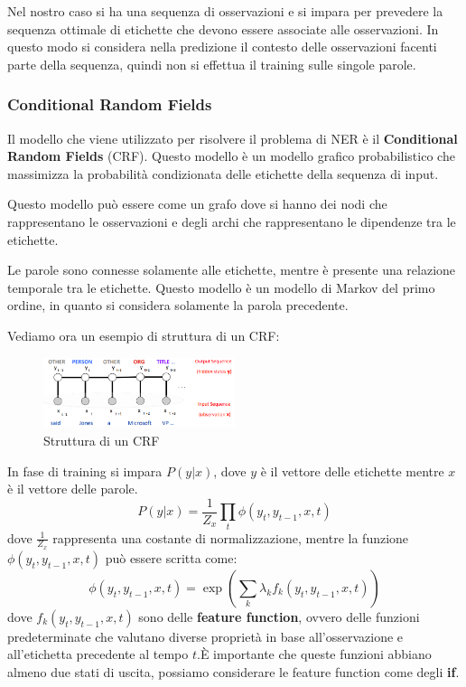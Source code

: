 Nel nostro caso si ha una sequenza di osservazioni e si impara per prevedere la
sequenza ottimale di etichette che devono essere associate alle osservazioni.
In questo modo si considera nella predizione il contesto delle osservazioni
facenti parte della sequenza, quindi non si effettua il training sulle singole parole.
\subsubsection{Conditional Random Fields}
Il modello che viene utilizzato per risolvere il problema di NER è il \textbf{Conditional
      Random Fields} (CRF). Questo modello è un modello grafico probabilistico che
massimizza la probabilità condizionata delle etichette della sequenza di input.

Questo modello può essere come un grafo dove si hanno dei nodi che rappresentano
le osservazioni e degli archi che rappresentano le dipendenze tra le etichette.

Le parole sono connesse solamente alle etichette, mentre è presente una relazione
temporale tra le etichette. Questo modello è un modello di Markov del primo ordine,
in quanto si considera solamente la parola precedente.

Vediamo ora un esempio di struttura di un CRF:
\begin{figure}[!ht]
      \centering
      \includegraphics[width=0.5\textwidth]{./img/nlp/crf.png}
      \caption{Struttura di un CRF}
      \label{fig:crf}
\end{figure}

In fase di training si impara $P(y|x)$, dove $y$ è il vettore delle etichette
mentre $x$ è il vettore delle parole.
\begin{equation}
      P(y|x) = \frac{1}{Z_x} \prod_t \phi(y_t,y_{t-1},x ,t)
\end{equation}
dove $\frac{1}{Z_x}$ rappresenta una costante di normalizzazione, mentre la
funzione $\phi(y_t,y_{t-1},x ,t)$ può essere scritta come:
\begin{equation}
      \phi(y_t,y_{t-1},x ,t) = \exp (\sum_k\lambda_k f_k(y_t,y_{t-1},x,t))
\end{equation}
dove $f_k(y_t,y_{t-1},x,t)$ sono delle \textbf{feature function}, ovvero delle
funzioni predeterminate che valutano diverse proprietà in base all'osservazione e
all'etichetta precedente al tempo $t$.È importante che queste funzioni abbiano
almeno due stati di uscita, possiamo considerare le feature function come degli
\textbf{if}.

